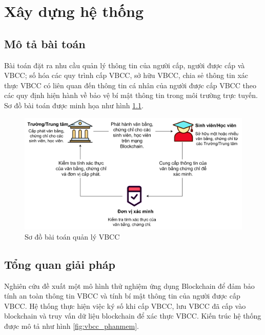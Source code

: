 \chapter{Xây dựng hệ thống}

\section{Mô tả bài toán}

Bài toán đặt ra nhu cầu quản lý thông tin của người cấp, người được cấp và VBCC; số hóa các quy trình cấp VBCC, sở hữu VBCC, chia sẻ thông tin xác thực VBCC có liên quan đến thông tin cá nhân của người được cấp VBCC theo các quy định hiện hành về bảo vệ bí mật thông tin trong môi trường trực tuyến.
Sơ đồ bài toán được minh họa như hình \ref{fig:vbcc}.

\begin{figure}[htbp]
\centering
\includegraphics[width=.9\linewidth]{img/vbcc.jpg}
\caption{Sơ đồ bài toán quản lý VBCC}
\label{fig:vbcc}
\end{figure}

\section{Tổng quan giải pháp}

Nghiên cứu đề xuất một mô hình thử nghiệm ứng dụng Blockchain để đảm bảo tính an toàn thông tin VBCC và tính bí mật thông tin của người được cấp VBCC.
Hệ thống thực hiện việc ký số khi cấp VBCC, lưu VBCC đã cấp vào blockchain và truy vấn dữ liệu blockchain để xác thực VBCC. 
Kiến trúc hệ thống được mô tả như hình \ref{fig:vbcc_phanmem}.

